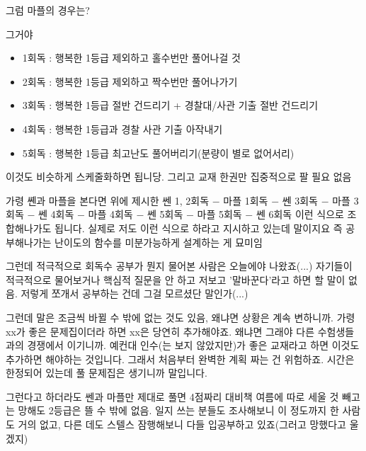 그럼 마플의 경우는?
\vspace{5mm}

그거야
\vspace{5mm}
\begin{itemize}
    \item 1회독 : 행복한 1등급 제외하고 홀수번만 풀어나걸 것
    \item 2회독 : 행복한 1등급 제외하고 짝수번만 풀어나가기
    \item 3회독 : 행복한 1등급 절반 건드리기 + 경찰대/사관 기출 절반 건드리기
    \item 4회독 : 행복한 1등급과 경찰 사관 기출 아작내기
    \item 5회독 : 행복한 1등급 최고난도 풀어버리기(분량이 별로 없어서리)
\end{itemize}
\vspace{5mm}

이것도 비슷하게 스케줄화하면 됩니당.
그리고 교재 한권만 집중적으로 팔 필요 없음
\vspace{5mm}

가령 쏀과 마플을 본다면
위에 제시한 쎈 1, 2회독 $-$ 마플 1회독 $-$ 쎈 3회독 $-$ 마플 3회독 $-$ 쎈 4회독 $-$ 마플 4회독 $-$ 쎈 5회독 $-$ 마플 5회독 $-$ 쎈 6회독
이런 식으로 조합해나가도 됩니다. 실제로 저도 이런 식으로 하라고 지시하고 있는데 말이지요
즉 공부해나가는 난이도의 함수를 미분가능하게 설계하는 게 묘미임
\vspace{5mm}

그런데 적극적으로 회독수 공부가 뭔지 물어본 사람은 오늘에야 나왔죠(...)
자기들이 적극적으로 물어보거나 핵심적 질문을 안 하고 저보고 '말바꾼다'라고 하면 할 말이 없음.
저렇게 쪼개서 공부하는 건데 그걸 모르셨단 말인가(...)
\vspace{5mm}

그런데 말은 조금씩 바뀔 수 밖에 없는 것도 있음, 왜냐면 상황은 계속 변하니까.
가령 xx가 좋은 문제집이더라 하면 xx은 당연히 추가해야죠. 왜냐면 그래야 다른 수험생들과의 경쟁에서 이기니까.
예컨대 인수(는 보지 않았지만)가 좋은 교재라고 하면 이것도 추가하면 해야하는 것입니다.
그래서 처음부터 완벽한 계획 짜는 건 위험하죠. 시간은 한정되어 있는데 풀 문제집은 생기니까 말입니다.
\vspace{5mm}

그런다고 하더라도 쎈과 마플만 제대로 풀면 4점짜리 대비책 여름에 따로 세울 것 빼고는 망해도 2등급은 뜰 수 밖에 없음.
일지 쓰는 분들도 조사해보니 이 정도까지 한 사람도 거의 없고, 다른 데도 스텔스 잠행해보니 다들 입공부하고 있죠(그러고 망했다고 울겠지)
\vspace{5mm}

